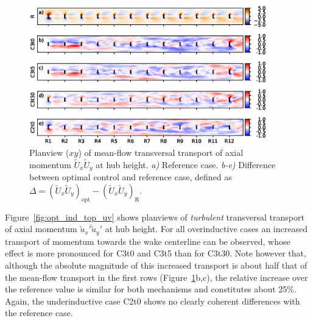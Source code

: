 		\begin{figure}[ht]
			\centering
			\includegraphics[width=0.92\textwidth]{chapters/optimal_induction_control/topview_uvm.eps}
			\caption[Planview ($xy$) of mean-flow transversal transport of axial momentum $\widetilde{U}_x \widetilde{U}_y$ at hub height.]{Planview ($xy$) of mean-flow transversal transport of axial momentum $\widetilde{U}_x \widetilde{U}_y$ at hub height. \emph{a) } Reference case. \emph{b-e)} Difference between optimal control and reference case, defined as $\Delta = (\widetilde{U}_x \widetilde{U}_y)_{\text{opt}} - (\widetilde{U}_x \widetilde{U}_y)_{\text{R}}$. \label{fig:opt_ind_top_uvm}}
		\end{figure}
	
		Figure~\ref{fig:opt_ind_top_uv} shows planviews of \emph{turbulent} transversal transport of axial momentum $\overline{\widetilde{u}_x' \widetilde{u}_y'}$ at hub height. For all overinductive cases an increased transport of momentum towards the wake centerline can be observed, whose effect is more pronounced for C3t0 and C3t5 than for C3t30. Note however that, although the absolute magnitude of this increased transport is about half that of the mean-flow transport in the first rows (Figure~\ref{fig:opt_ind_top_uvm}b,c), the relative increase over the reference value is similar for both mechanisms and constitutes about 25\%. Again, the underinductive case C2t0 shows no clearly coherent differences with the reference case. 
	
